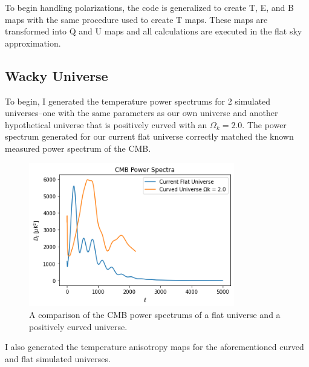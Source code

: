 \documentclass[12pt]{article}
\begin{document}
To begin handling polarizations, the code is generalized to create T, E, and B maps with the same procedure used to create T maps. These maps are transformed into Q and U maps and all calculations are executed in the flat sky approximation.


\subsection{Wacky Universe}
To begin, I generated the temperature power spectrums for 2 simulated universes–one with the same parameters as our own universe and another hypothetical universe that is positively curved with an $\Omega_k = 2.0$. The power spectrum generated for our current flat universe correctly matched the known measured power spectrum of the CMB.

\begin{figure}[H]
    \centering
    \includegraphics[width=0.8\textwidth]{images/power spectrum.png}
    \caption{A comparison of the CMB power spectrums of a flat universe and a positively curved universe.}
    \label{fig:my_label}
\end{figure}

I also generated the temperature anisotropy maps for the aforementioned curved and flat simulated universes.
\end{document}
